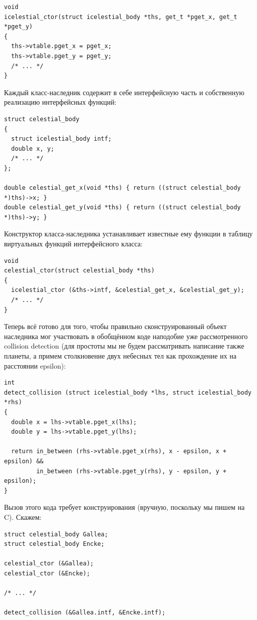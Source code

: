 \documentclass[a4paper,12pt,oneside]{article}
\begin{document}
\begin{lstlisting}
void
icelestial_ctor(struct icelestial_body *ths, get_t *pget_x, get_t *pget_y)
{
  ths->vtable.pget_x = pget_x;
  ths->vtable.pget_y = pget_y;
  /* ... */
}
\end{lstlisting}

Каждый класс-наследник содержит в себе интерфейсную часть и собственную реализацию интерфейсных функций:

\begin{lstlisting}
struct celestial_body
{
  struct icelestial_body intf;
  double x, y;
  /* ... */
};

double celestial_get_x(void *ths) { return ((struct celestial_body *)ths)->x; }
double celestial_get_y(void *ths) { return ((struct celestial_body *)ths)->y; }
\end{lstlisting}

Конструктор класса-наследника устанавливает известные ему функции в таблицу виртуальных функций интерфейсного класса:

\begin{lstlisting}
void 
celestial_ctor(struct celestial_body *ths)
{
  icelestial_ctor (&ths->intf, &celestial_get_x, &celestial_get_y);
  /* ... */  
}
\end{lstlisting}

Теперь всё готово для того, чтобы правильно сконструированный объект наследника мог участвовать в обобщённом коде наподобие уже рассмотренного collision detection (для простоты мы не будем рассматривать написание также планеты, а примем столкновение двух небесных тел как прохождение их на расстоянии epsilon):

\begin{lstlisting}
int
detect_collision (struct icelestial_body *lhs, struct icelestial_body *rhs)
{
  double x = lhs->vtable.pget_x(lhs);
  double y = lhs->vtable.pget_y(lhs);
 
  return in_between (rhs->vtable.pget_x(rhs), x - epsilon, x + epsilon) && 
         in_between (rhs->vtable.pget_y(rhs), y - epsilon, y + epsilon);
}
\end{lstlisting}

Вызов этого кода требует конструирования (вручную, поскольку мы пишем на C). Скажем:

\begin{lstlisting}
struct celestial_body Gallea;
struct celestial_body Encke;

celestial_ctor (&Gallea);
celestial_ctor (&Encke);

/* ... */

detect_collision (&Gallea.intf, &Encke.intf);
\end{lstlisting}
\end{document}
